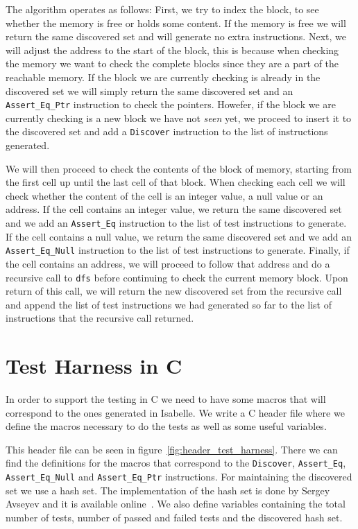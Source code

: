 The algorithm operates as follows:
First, we try to index the block, to see whether the memory is free or holds some content.
If the memory is free we will return the same discovered set and will generate no extra instructions.
Next, we will adjust the address to the start of the block, this is because when checking the memory we want to check the complete blocks since they are a part of the reachable memory.
If the block we are currently checking is already in the discovered set we will simply return the same discovered set and an \verb|Assert_Eq_Ptr| instruction to check the pointers.
Howefer, if the block we are currently checking is a new block we have not \textit{seen} yet, we proceed to insert it to the discovered set and add a \verb|Discover| instruction to the list of instructions generated.

We will then proceed to check the contents of the block of memory, starting from the first cell up until the last cell of that block.
When checking each cell we will check whether the content of the cell is an integer value, a null value or an address.
If the cell contains an integer value, we return the same discovered set and we add an \verb|Assert_Eq| instruction to the list of test instructions to generate.
If the cell contains a null value, we return the same discovered set and we add an \verb|Assert_Eq_Null| instruction to the list of test instructions to generate.
Finally, if the cell contains an address, we will proceed to follow that address and do a recursive call to \verb|dfs| before continuing to check the current memory block.
Upon return of this call, we will return the new discovered set from the recursive call and append the list of test instructions we had generated so far to the list of instructions that the recursive call returned.


\section{Test Harness in C}

In order to support the testing in C we need to have some macros that will correspond to the ones generated in Isabelle.
We write a C header file where we define the macros necessary to do the tests as well as some useful variables.

This header file can be seen in figure~\ref{fig:header_test_harness}.
There we can find the definitions for the macros that correspond to the \verb|Discover|, \verb|Assert_Eq|, \verb|Assert_Eq_Null| and \verb|Assert_Eq_Ptr| instructions.
For maintaining the discovered set we use a hash set.
The implementation of the hash set is done by Sergey Avseyev and it is available online~\parencite{hashset}.
We also define variables containing the total number of tests, number of passed and failed tests and the discovered hash set.


